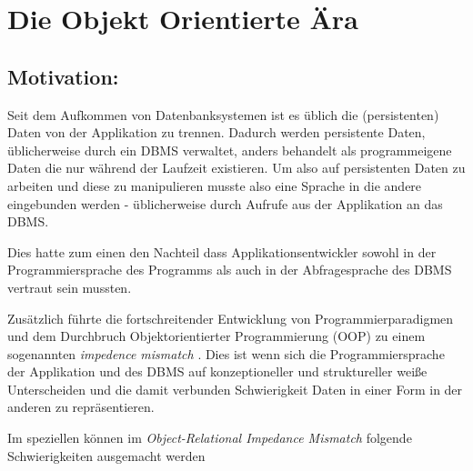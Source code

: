 


%


\section{Die Objekt Orientierte Ära}

\subsection{Motivation:}

Seit dem Aufkommen von Datenbanksystemen ist es üblich die (persistenten) Daten von der Applikation zu trennen. Dadurch werden persistente Daten, üblicherweise durch ein DBMS verwaltet, anders behandelt als programmeigene Daten die nur während der Laufzeit existieren. Um also auf persistenten Daten zu arbeiten und diese zu manipulieren musste also eine Sprache in die andere eingebunden werden - üblicherweise durch Aufrufe aus der Applikation an das DBMS.

Dies hatte zum einen den Nachteil dass Applikationsentwickler sowohl in der Programmiersprache des Programms als auch in der Abfragesprache des DBMS vertraut sein mussten.

Zusätzlich führte die fortschreitender Entwicklung von Programmierparadigmen und dem Durchbruch Objektorientierter Programmierung (OOP) zu einem sogenannten \emph{impedence mismatch} \cite{copeland1984}. Dies ist wenn sich die Programmiersprache der Applikation und des DBMS auf konzeptioneller und struktureller weiße Unterscheiden und die damit verbunden Schwierigkeit Daten in einer Form in der anderen zu repräsentieren.

Im speziellen können im \emph{Object-Relational Impedance Mismatch} folgende Schwierigkeiten ausgemacht werden \cite{ireland2009}


